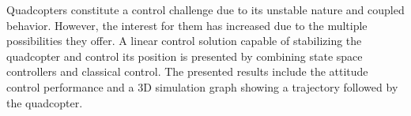 

Quadcopters constitute a control challenge due to its unstable nature and coupled behavior. However, the interest for them has increased due to the multiple possibilities they offer. A linear control solution capable of stabilizing the quadcopter and control its position is presented by combining state space controllers and classical control. The presented results include the attitude control performance and a 3D simulation graph showing a trajectory followed by the quadcopter.